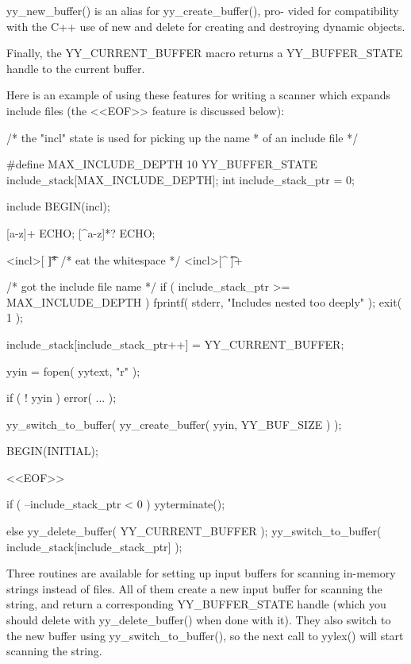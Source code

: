 \documentclass[12pt,spanish,twocolumn,lettersize]{article}
\begin{document}
{       yy_new_buffer() is an alias for	yy_create_buffer(),  pro-
       vided for compatibility with the C++ use of new and delete
       for creating and destroying dynamic objects.

       Finally,	  the	YY_CURRENT_BUFFER   macro    returns	a
       YY_BUFFER_STATE handle to the current buffer.

       Here  is	 an example of using these features for writing a
       scanner which expands include files (the	 <<EOF>>  feature
       is discussed below):

	   /* the "incl" state is used for picking up the name
	    * of an include file
	    */

	   #define MAX_INCLUDE_DEPTH 10
	   YY_BUFFER_STATE include_stack[MAX_INCLUDE_DEPTH];
	   int include_stack_ptr = 0;

	   include	       BEGIN(incl);

	   [a-z]+	       ECHO;
	   [^a-z\n]*\n?	       ECHO;

	   <incl>[ \t]*	     /* eat the whitespace */
	   <incl>[^ \t\n]+   { /* got the include file name */
		   if ( include_stack_ptr >= MAX_INCLUDE_DEPTH )
		       {
		       fprintf( stderr, "Includes nested too deeply" );
		       exit( 1 );
		       }

		   include_stack[include_stack_ptr++] =
		       YY_CURRENT_BUFFER;

		   yyin = fopen( yytext, "r" );

		   if ( ! yyin )
		       error( ... );

		   yy_switch_to_buffer(
		       yy_create_buffer( yyin, YY_BUF_SIZE ) );

		   BEGIN(INITIAL);

		   }

	   <<EOF>> {
		   if ( --include_stack_ptr < 0 )
		       {
		       yyterminate();
		       }

		   else
		       {
		       yy_delete_buffer( YY_CURRENT_BUFFER );
		       yy_switch_to_buffer(
			    include_stack[include_stack_ptr] );
		       }
		   }

       Three  routines are available for setting up input buffers
       for scanning in-memory strings instead of files.	  All  of
       them  create  a	new input buffer for scanning the string,
       and return a corresponding YY_BUFFER_STATE  handle  (which
       you  should  delete with yy_delete_buffer() when done with
       it).   They  also  switch  to   the   new   buffer   using
       yy_switch_to_buffer(),  so  the	next call to yylex() will
       start scanning the string.

}
\end{document}
